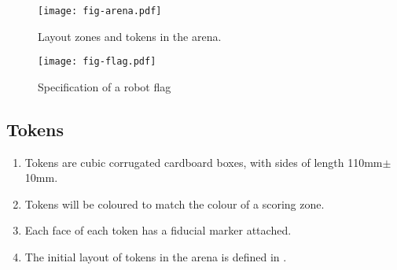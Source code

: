 \begin{figure}
  \texttt{[image: fig-arena.pdf]}
  \caption{Layout zones and tokens in the arena.}
  \label{fig:arena}
\end{figure}

\begin{figure}
  \texttt{[image: fig-flag.pdf]}
  \caption{Specification of a robot flag}
  \label{fig:flag}
\end{figure}
\subsection{Tokens}
\label{spec:tokens}

\begin{enumerate}
  \item Tokens are cubic corrugated cardboard boxes, with sides of length
        \si{110}{mm}$\pm$\si{10}{mm}.
  \item Tokens will be coloured to match the colour of a scoring zone.
  \item Each face of each token has a fiducial marker attached.
  \item The initial layout of tokens in the arena is defined in
        .
\end{enumerate}
